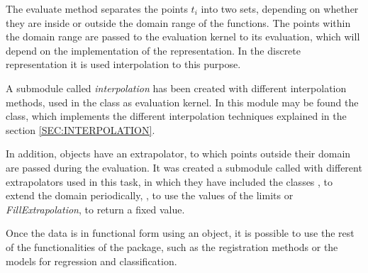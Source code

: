 The evaluate method separates the points $t_i$ into two sets, depending on
whether they are inside or outside the domain range of the functions. The points
within the domain range are passed to the evaluation kernel to its evaluation,
which will depend  on the implementation of the representation. In the discrete
representation it is used interpolation to this purpose.

A submodule called \textit{interpolation} has been created with different
interpolation methods, used in the class  as evaluation kernel.
In this module may be found the  class,
which implements the different interpolation techniques explained in the
section \ref{SEC:INTERPOLATION}.

In addition,  objects have an extrapolator, to which
points outside their domain are passed during the evaluation. It was created
a submodule called  with different extrapolators used in
this task,
in which they have included the classes , to
extend the domain periodically, , to use the
values of the limits or \textit{FillExtrapolation}, to return a fixed value.

Once the data is in functional form using an  object,
it is possible to use the rest of the functionalities of the package, such as
the registration methods or the models for regression and classification.
